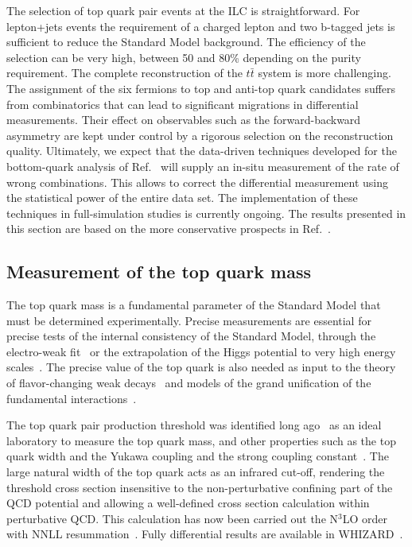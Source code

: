 The selection of top quark pair events at the ILC is straightforward. For lepton+jets events 
the requirement of a charged lepton and two b-tagged jets is sufficient to reduce the Standard
Model background. The efficiency of the selection can be very high, between 50 and 80\% depending
on the purity requirement. The complete reconstruction of the $t\bar{t}$ system is more
challenging. The assignment of the six fermions to top and anti-top quark candidates suffers
from combinatorics that can lead to significant migrations in differential measurements. 
Their effect on observables such as the forward-backward asymmetry are kept under control by
a rigorous selection on the reconstruction quality. 
Ultimately, we expect that the data-driven techniques developed for the bottom-quark analysis of 
Ref.~\cite{Bilokin:2017lco, bilokin:tel-01946099} will supply an in-situ measurement of 
the rate of wrong combinations. This allows to correct the differential measurement using
the statistical power of the entire data set. The implementation of these techniques in
full-simulation studies is currently ongoing. The results presented in this section are 
based on the more conservative prospects in Ref.~\cite{Amjad:2015mma,Bernreuther:2017cyi,Abramowicz:2018rjq}. 



\subsection{Measurement of the top quark mass}
\label{subsec:top:topmass}

The top quark mass is a fundamental parameter of the Standard Model that must be
determined experimentally. Precise measurements are essential for precise tests of
the internal consistency of the Standard Model, through the electro-weak
fit~\cite{Baak:2014ora} or the extrapolation of the Higgs potential to
very high energy
scales~\cite{Degrassi:2012ry}.   The precise value of the top quark is
also needed as input to the theory of flavor-changing weak
decays~\cite{Buras:2009if} and models of the grand unification of the
fundamental interactions~\cite{Langacker:1994vf}.

The top quark pair production threshold was identified long ago~\cite{Gusken:1985nf} as
an ideal laboratory to measure the top quark mass, and other properties such as the top quark
width and the Yukawa coupling and the strong coupling constant~\cite{Strassler:1990nw}.
The large natural width of the top quark acts as an infrared cut-off,
rendering the threshold cross section insensitive to the non-perturbative confining part
of the QCD potential and allowing a well-defined  cross section
calculation within  perturbative QCD.  This calculation has now been
carried out the N$^3$LO order~\cite{Beneke:2015kwa} with  NNLL resummation~\cite{Hoang:2013uda}. Fully differential results are available in WHIZARD~\cite{Bach:2017ggt}.

